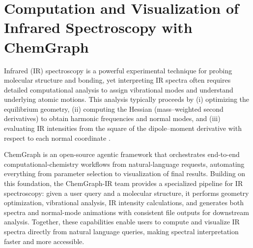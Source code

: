 




\section{Computation and Visualization of Infrared Spectroscopy with ChemGraph}

Infrared (IR) spectroscopy is a powerful experimental technique for probing molecular structure and bonding, yet interpreting IR spectra often requires detailed computational analysis to assign vibrational modes and understand underlying atomic motions.
This analysis typically proceeds by (i) optimizing the equilibrium geometry, (ii) computing the Hessian (mass--weighted second derivatives) to obtain harmonic frequencies and normal modes, and (iii) evaluating IR intensities from the square of the dipole--moment derivative with respect to each normal coordinate \cite{wilson1980molecular}.

ChemGraph\cite{pham2025chemgraph} is an open-source agentic framework that orchestrates end-to-end computational-chemistry workflows from natural-language requests, automating everything from parameter selection to visualization of final results.
Building on this foundation, the ChemGraph-IR team provides a specialized pipeline for IR spectroscopy: given a user query and a molecular structure, it performs geometry optimization, vibrational analysis, IR intensity calculations, and generates both spectra and normal-mode animations with consistent file outputs for downstream analysis.
Together, these capabilities enable users to compute and visualize IR spectra directly from natural language queries, making spectral interpretation faster and more accessible.

